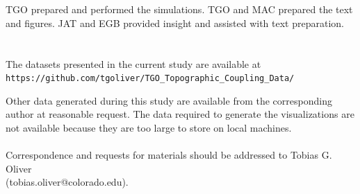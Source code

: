 \noindent
\\
\\
TGO prepared and performed the simulations. TGO and MAC prepared the text and figures. JAT and EGB provided insight and assisted with text preparation.
\\
\\
\\
The datasets presented in the current study are available at
\\
\texttt{https://github.com/tgoliver/TGO\_Topographic\_Coupling\_Data/}

\noindent
Other data generated during this study are available from the corresponding author at reasonable request.
The data required to generate the visualizations are not available because they are too large to store on local machines.
\\
\\
Correspondence and requests for materials should be addressed to Tobias G. Oliver\\ 
(tobias.oliver@colorado.edu).
